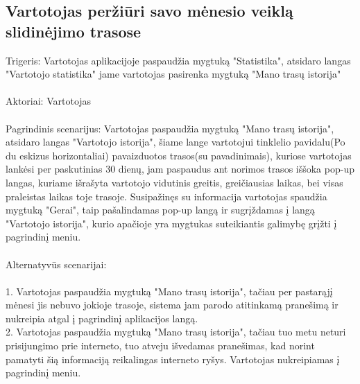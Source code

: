 \documentclass[oneside]{VUMIFPSkursinis}
\begin{document}
\subsection{Vartotojas peržiūri savo mėnesio veiklą slidinėjimo trasose}
Trigeris: Vartotojas aplikacijoje paspaudžia mygtuką "Statistika", atsidaro langas "Vartotojo statistika" jame vartotojas pasirenka mygtuką "Mano trasų istorija" \\ \\
Aktoriai: Vartotojas \\ \\
Pagrindinis scenarijus: Vartotojas paspaudžia mygtuką "Mano trasų istorija", atsidaro langas "Vartotojo istorija", šiame lange vartotojui tinklelio pavidalu(Po du eskizus horizontaliai) pavaizduotos trasos(su pavadinimais), kuriose vartotojas lankėsi per paskutinias 30 dienų, jam paspaudus ant norimos trasos iššoka pop-up langas, kuriame išrašyta vartotojo vidutinis greitis, greičiausias laikas, bei visas praleistas laikas toje trasoje. Susipažinęs su informacija vartotojas spaudžia mygtuką "Gerai", taip pašalindamas pop-up langą ir sugrįždamas į  langą "Vartotojo istorija", kurio apačioje yra mygtukas suteikiantis galimybę grįžti į pagrindinį meniu. \\ \\
Alternatyvūs scenarijai: \\ \\
1. Vartotojas paspaudžia mygtuką "Mano trasų istorija", tačiau per pastarąjį mėnesi jis nebuvo jokioje trasoje, sistema jam parodo atitinkamą pranešimą ir nukreipia atgal į pagrindinį aplikacijos langą. \\
2. Vartotojas paspaudžia mygtuką "Mano trasų istorija", tačiau tuo metu neturi prisijungimo prie interneto, tuo atveju išvedamas pranešimas, kad norint pamatyti šią informaciją reikalingas interneto ryšys. Vartotojas nukreipiamas į pagrindinį meniu. \\
\end{document}
